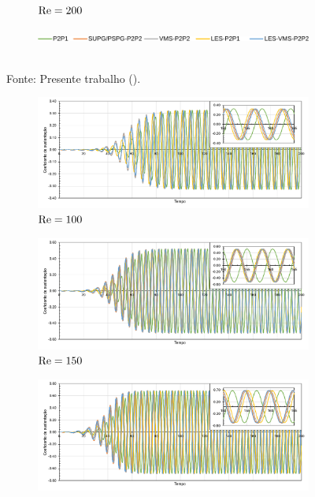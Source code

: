 \begin{figure}[h!]
\begin{subfigure}{\textwidth}
        \caption{$\mathrm{Re}=200$}
    \end{subfigure}
    \begin{subfigure}{.8\textwidth}
        \includegraphics[width=\linewidth]{Figuras/cylinder/legenda.pdf}
    \end{subfigure}
    \\Fonte: Presente trabalho (\the\year).
    \label{fig:cyl-Cd}
\end{figure}
\newpage

\begin{figure}[h!]
    \centering
    \caption{Escoamento sobre cilindro - Coeficiente de sustentação ao longo do tempo.}
    \begin{subfigure}{\textwidth}
        \includegraphics[width=\linewidth]{Figuras/cylinder/analise3/Cl-100.pdf}
        \caption{$\mathrm{Re}=100$}
    \end{subfigure}
    \begin{subfigure}{\textwidth}
        \includegraphics[width=\linewidth]{Figuras/cylinder/analise3/Cl-150.pdf}
        \caption{$\mathrm{Re}=150$}
    \end{subfigure}
    \begin{subfigure}{\textwidth}
        \includegraphics[width=\linewidth]{Figuras/cylinder/analise3/Cl-200.pdf}

\end{subfigure}
\end{figure}
